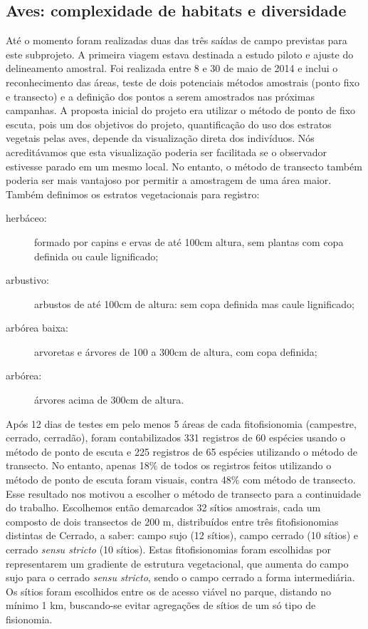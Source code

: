 \subsection{Aves: complexidade de habitats e diversidade} %
\label{sec:compl-de-habit} 

Até o momento foram realizadas duas das três saídas de campo previstas
para este subprojeto. A primeira viagem estava destinada a estudo piloto
e ajuste do delineamento amostral. Foi realizada entre 8 e 30 de
maio de 2014 e inclui o reconhecimento das áreas, teste de dois
potenciais métodos amostrais (ponto fixo e transecto) e a definição dos pontos a serem
amostrados nas próximas campanhas. 
A proposta inicial do projeto era utilizar o método de ponto de
fixo escuta, pois um dos objetivos do projeto, quantificação do uso dos
estratos vegetais pelas aves, depende da visualização direta dos
indivíduos. Nós acreditávamos que esta visualização poderia ser
facilitada se o observador estivesse parado em um mesmo local. No
entanto, o método de transecto também poderia ser mais vantajoso por
permitir a amostragem de uma área maior. 
Também definimos os estratos vegetacionais para registro: 
\begin{description}
\item[herbáceo:] formado por capins e ervas de até 100cm altura, sem plantas com copa definida ou caule lignificado;
\item[arbustivo:] arbustos de até 100cm de altura: sem copa definida mas caule lignificado;
\item[arbórea baixa:] arvoretas e árvores de 100 a 300cm de altura, com copa definida;
\item[arbórea:] árvores acima de 300cm de altura. 
\end{description}

 Após 12 dias de testes em 
pelo menos 5 áreas de cada fitofisionomia (campestre, cerrado, cerradão),
foram contabilizados 331 registros de 60 espécies usando o método de
ponto de escuta e 225 registros de 65 espécies utilizando o método de
transecto. No entanto, apenas 18\% de todos os registros feitos
utilizando o método de ponto de escuta foram visuais, contra 48\%
com  método de transecto. Esse resultado nos motivou a escolher o método de
transecto para a continuidade do trabalho.
Escolhemos então demarcados 32 sítios amostrais,
cada um composto de dois transectos de 200 m, distribuídos entre três
fitofisionomias distintas de Cerrado, a saber: campo sujo (12 sítios), campo
cerrado (10 sítios) e cerrado \textit{sensu stricto} (10 sítios). 
Estas fitofisionomias foram
escolhidas por representarem um gradiente de estrutura vegetacional,
que aumenta do campo sujo para o cerrado \textit{sensu stricto}, sendo
o campo cerrado a forma intermediária. Os sítios foram escolhidos entre
os de acesso viável no parque, distando no mínimo 1 km, buscando-se
evitar agregações de sítios de um só tipo de fisionomia.

